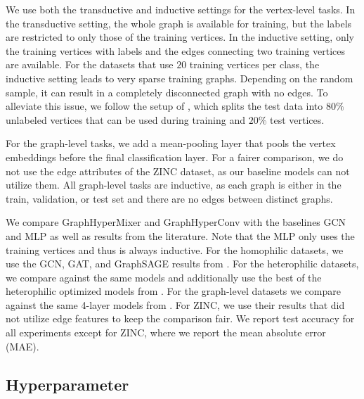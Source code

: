 \documentclass[conference]{IEEEtran}
\begin{document}
We use both the transductive and inductive settings for the vertex-level tasks.
In the transductive setting, the whole graph is available for training, but the labels are restricted to only those of the training vertices.
In the inductive setting, only the training vertices with labels and the edges connecting two training vertices are available.
For the datasets that use $20$ training vertices per class, the inductive setting leads to very sparse training graphs.
Depending on the random sample, it can result in a completely disconnected graph with no edges.
To alleviate this issue, we follow the setup of \citet{NOSMOG}, which splits the test data into $80\%$ unlabeled vertices that can be used during training and $20\%$ test vertices.

For the graph-level tasks, we add a mean-pooling layer that pools the vertex embeddings before the final classification layer. 
For a fairer comparison, we do not use the edge attributes of the ZINC dataset, as our baseline models can not utilize them.
All graph-level tasks are inductive, as each graph is either in the train, validation, or test set and there are no edges between distinct graphs.

We compare GraphHyperMixer and GraphHyperConv with the baselines GCN and MLP as well as results from the literature.
Note that the MLP only uses the training vertices and thus is always inductive.
For the homophilic datasets, we use the GCN, GAT, and GraphSAGE results from \cite{shchur}.
For the heterophilic datasets, we compare against the same models and additionally use the best of the heterophilic optimized models from \cite{heter}.
For the graph-level datasets we compare against the same 4-layer models from \cite{DBLP:journals/jmlr/DwivediJL0BB23}.
For ZINC, we use their results that did not utilize edge features to keep the comparison fair.
We report test accuracy for all experiments except for ZINC, where we report the mean absolute error (MAE).


\subsection{Hyperparameter}
\end{document}
